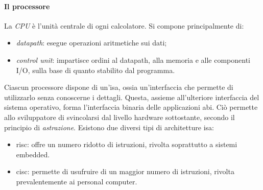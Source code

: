 \documentclass[class=book, crop=false, oneside]{standalone}
\begin{document}
\paragraph*{Il processore}
La \emph{CPU} è l'unità centrale di ogni calcolatore. Si compone principalmente di:
\begin{itemize}[noitemsep]
	\item \emph{datapath}: esegue operazioni aritmetiche sui dati;
	\item \emph{control unit}: impartisce ordini al datapath, alla memoria e alle componenti I/O, sulla base di quanto stabilito dal programma.
\end{itemize}
Ciascun processore dispone di un'\acrfull{isa}, ossia un'interfaccia che permette di utilizzarlo senza conoscerne i dettagli.
Questa, assieme all'ulteriore interfaccia del sistema operativo, forma l'interfaccia binaria delle applicazioni \acrfull{abi}.
Ciò permette allo sviluppatore di svincolarsi dal livello hardware sottostante, secondo il principio di \emph{astrazione}. Esistono due diversi tipi di architetture \acrshort{isa}:
\begin{itemize}[noitemsep]
	\item \acrshort{risc}: offre un numero ridotto di istruzioni, rivolta soprattutto a sistemi embedded.
	\item \acrshort{cisc}: permette di usufruire di un maggior numero di istruzioni, rivolta prevalentemente ai personal computer.
\end{itemize}
\end{document}
